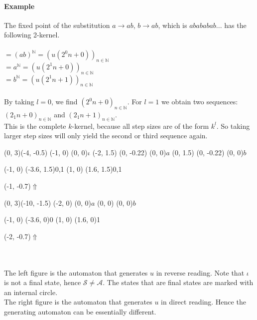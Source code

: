 \documentclass{article}
\begin{document}
\paragraph{Example}
The fixed point of the substitution $a \rightarrow ab$, $b \rightarrow ab$,
which is $abababab...$ has the following 2-kernel.\\
\\
$= (ab)^\mathbb{N} = (u(2^0 n + 0))_{n \in \mathbb{N}}$\\
$= a^\mathbb{N} = (u(2^1 n + 0))_{n \in \mathbb{N}}$\\
$= b^\mathbb{N} = (u(2^1 n + 1))_{n \in \mathbb{N}}$\\
\\
By taking $l = 0$, we find $(2^0 n + 0)_{n \in \mathbb{N}}$. For $l = 1$ we
obtain two sequences: $(2_1 n + 0)_{n \in \mathbb{N}}$ and
$(2_1 n + 1)_{n \in \mathbb{N}}$.\\
This is the complete $k$-kernel, because all step sizes are of the form
$k^l$. So taking larger step sizes will only yield the second or third
sequence again.\\
\begin{graph}(0, 3)(-4, -0.5)
  (-1, 0) (0, 0){$\iota$}
  (-2, 1.5)
    (0, -0.22){} (0, 0){$a$}
  (0, 1.5)
    (0, -0.22){} (0, 0){$b$}

   
   
  (-1, 0) \freetext(-3.6, 1.5){0,1}
  (1, 0) \freetext(1.6, 1.5){0,1}

  \freetext(-1, -0.7){$\Uparrow$}
\end{graph}
\begin{graph}(0, 3)(-10, -1.5)
  (-2, 0) (0, 0){$a$}
  (0, 0)  (0, 0){$b$}

  (-1, 0) \freetext(-3.6, 0){0}
   
   
  (1, 0) \freetext(1.6, 0){1}

  \freetext(-2, -0.7){$\Uparrow$}
\end{graph}\\
\\
The left figure is the automaton that generates $u$ in reverse reading. Note 
that $\iota$ is not a final state, hence $\mathcal{S} \ne \mathcal{A}$. The 
states that are final states are marked with an internal circle.\\
The right figure is the automaton that generates $u$ in direct reading. Hence
the generating automaton can be essentially different.
\end{document}
